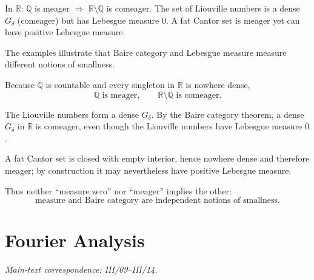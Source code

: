 \begin{problem}[CP-III-0021]
\label{prob:cp-iii-0021}
\begin{example}
	In $\mathbb R$: $\mathbb Q$ is meager $\Rightarrow$ $\mathbb R\setminus\mathbb Q$ is comeager.
	The set of Liouville numbers is a dense $G_\delta$ (comeager) but has Lebesgue measure $0$.
	A fat Cantor set is meager yet can have positive Lebesgue measure.
\end{example}
\end{problem}

\begin{solution}
The examples illustrate that Baire category and Lebesgue measure measure
different notions of smallness.

Because \(\mathbb Q\) is countable and every singleton in \(\mathbb R\)
is nowhere dense,
\[
\mathbb Q\text{ is meager},
\qquad
\mathbb R\setminus\mathbb Q\text{ is comeager}.
\]

The Liouville numbers form a dense \(G_\delta\).  By the Baire category
theorem, a dense \(G_\delta\) in \(\mathbb R\) is comeager, even though
the Liouville numbers have Lebesgue measure \(0\).

A fat Cantor set is closed with empty interior, hence nowhere dense and
therefore meager; by construction it may nevertheless have positive
Lebesgue measure.

Thus neither ``measure zero'' nor ``meager'' implies the other:
\[
\boxed{
\text{measure and Baire category are independent notions of smallness}.
}
\]
\end{solution}


\section{Fourier Analysis}
\noindent\textit{Main-text correspondence: III/09--III/14.}

